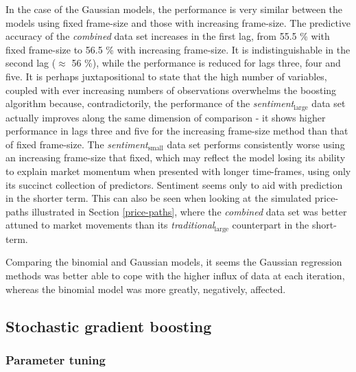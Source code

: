 \documentclass{article}
\begin{document}
In the case of the Gaussian models, the performance is very similar between the models using fixed frame-size and those with increasing frame-size. The predictive accuracy of the \emph{combined} data set increases in the first lag, from 55.5 \% with fixed frame-size to 56.5 \% with increasing frame-size. It is indistinguishable in the second lag ($\approx$ 56 \%), while the performance is reduced for lags three, four and five. It is perhaps juxtapositional to state that the high number of variables, coupled with ever increasing numbers of observations overwhelms the boosting algorithm because, contradictorily, the performance of the \emph{sentiment$_{\text{large}}$} data set actually improves along the same dimension of comparison - it shows higher performance in lags three and five for the increasing frame-size method than that of fixed frame-size. The \emph{sentiment$_{\text{small}}$} data set performs consistently worse using an increasing frame-size that fixed, which may reflect the model losing its ability to explain market momentum when presented with longer time-frames, using only its succinct collection of predictors. Sentiment seems only to aid with prediction in the shorter term. This can also be seen when looking at the simulated price-paths illustrated in Section \ref{price-paths}, where the \emph{combined} data set was better attuned to market movements than its \emph{traditional$_{\text{large}}$} counterpart in the short-term.

Comparing the binomial and Gaussian models, it seems the Gaussian regression methods was better able to cope with the higher influx of data at each iteration, whereas the binomial model was more greatly, negatively, affected.



\subsection{Stochastic gradient boosting \label{stochastic-boosting}}
\label{sec-1-5}


\subsubsection{Parameter tuning}
\label{sec-1-5-1}
\end{document}
